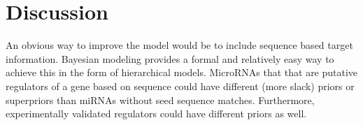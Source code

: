 

\section{Discussion}
\thispagestyle{empty}

An obvious way to improve the model would be to include sequence based target
information. Bayesian modeling provides a formal and relatively easy
way to achieve this in the form of hierarchical models. MicroRNAs that
that are putative regulators of a gene based on sequence could have
different (more slack) priors or superpriors than miRNAs without
seed sequence matches. Furthermore, experimentally validated regulators
could have different priors as well.
